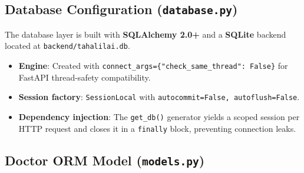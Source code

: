 \documentclass[12pt, a4paper]{article}
\newcommand{\file}[1]{\texttt{\color{accent}#1}}
\newcommand{\func}[1]{\texttt{\color{danger}#1}}
\begin{document}
\subsection{Database Configuration (\file{database.py})}

The database layer is built with \textbf{SQLAlchemy 2.0+} and a
\textbf{SQLite} backend located at \file{backend/tahalilai.db}.

\begin{itemize}[leftmargin=*, itemsep=3pt]
  \item \textbf{Engine}: Created with
        \texttt{connect\_args=\{"check\_same\_thread": False\}} for
        FastAPI thread-safety compatibility.
  \item \textbf{Session factory}: \texttt{SessionLocal} with
        \texttt{autocommit=False, autoflush=False}.
  \item \textbf{Dependency injection}: The \func{get\_db()} generator
        yields a scoped session per HTTP request and closes it in a
        \texttt{finally} block, preventing connection leaks.
\end{itemize}

\subsection{Doctor ORM Model (\file{models.py})}
\end{document}
